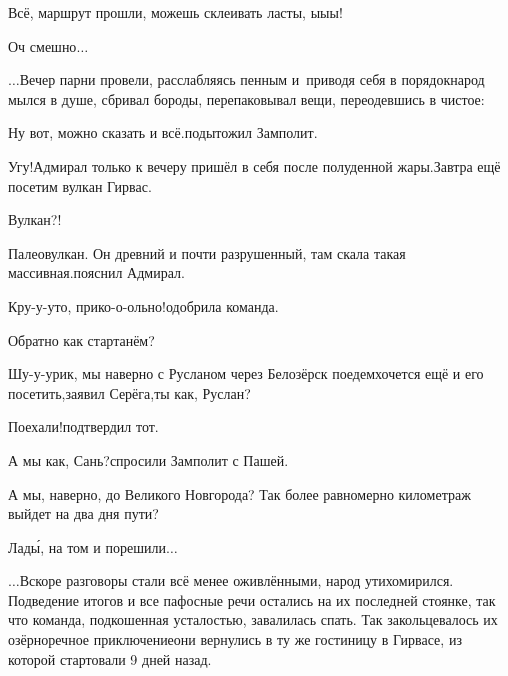 \diagdash Всё, маршрут прошли, можешь склеивать ласты, ы\sdash ы\sdash ы!

\diagdash Оч смешно$\ldots$

\vspace{1em}
$\ldots$Вечер парни провели, расслабляясь пенным и~приводя себя в порядок\mdash народ мылся в душе, сбривал бороды, перепаковывал вещи, переодевшись в чистое:

\diagdash Ну вот, можно сказать и всё.\mdash подытожил Замполит.

\diagdash Угу!\mdash Адмирал только к вечеру пришёл в себя после полуденной жары.\mdash Завтра ещё посетим вулкан Гирвас.

\diagdash Вулкан?!

\diagdash Палеовулкан. Он древний и почти разрушенный, там скала такая массивная.\mdash пояснил Адмирал.

\diagdash Кру-у-уто, прико-о-ольно!\mdash одобрила команда.

\diagdash Обратно как стартанём?

\diagdash Шу-у-урик, мы наверно с Русланом через Белозёрск поедем\mdash хочется ещё и его посетить,\mdash заявил Серёга,\mdash ты как, Руслан?

\diagdash Поехали!\mdash подтвердил тот.

\diagdash А мы как, Сань?\mdash спросили Замполит с Пашей.

\diagdash А мы, наверно, до Великого Новгорода? Так более равномерно километраж выйдет на два дня пути?

\diagdash Лад\'{ы}, на том и порешили$\ldots$

$\ldots$Вскоре разговоры стали всё менее оживлёнными, народ утихомирился. Подведение итогов и все пафосные речи остались на их последней стоянке, так что команда, подкошенная усталостью, завалилась спать. Так закольцевалось их озёрно\sdash речное приключение\mdash они вернулись в ту же гостиницу в Гирвасе, из которой стартовали 9 дней назад.

\begin{center}
\end{center}
